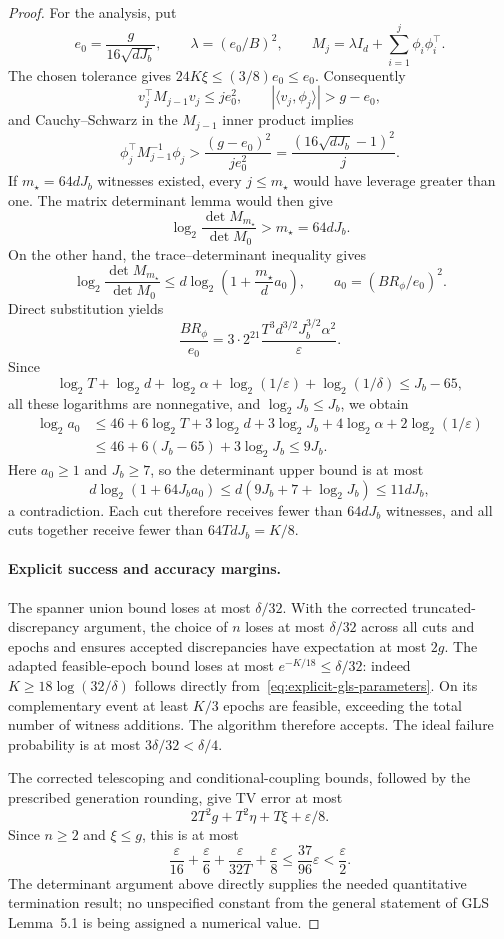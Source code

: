\documentclass[11pt]{article}
\theoremstyle{definition}
\theoremstyle{remark}
\begin{document}
\begin{proof}
For the analysis, put
\[
e_0=\frac{g}{16\sqrt{dJ_b}},\qquad
\lambda=(e_0/B)^2,\qquad
M_j=\lambda I_d+\sum_{i=1}^{j}\phi_i\phi_i^\top.
\]
The chosen tolerance gives $24K\xi\le(3/8)e_0\le e_0$. Consequently
\[
v_j^\top M_{j-1}v_j\le je_0^2,\qquad
|\langle v_j,\phi_j\rangle|>g-e_0,
\]
and Cauchy--Schwarz in the $M_{j-1}$ inner product implies
\[
\phi_j^\top M_{j-1}^{-1}\phi_j
>\frac{(g-e_0)^2}{je_0^2}
=\frac{(16\sqrt{dJ_b}-1)^2}{j}.
\]
If $m_\star=64dJ_b$ witnesses existed, every $j\le m_\star$ would have leverage greater than one. The matrix determinant lemma would then give
\[
\log_2\frac{\det M_{m_\star}}{\det M_0}>m_\star=64dJ_b.
\]
On the other hand, the trace--determinant inequality gives
\[
\log_2\frac{\det M_{m_\star}}{\det M_0}
\le d\log_2\left(1+\frac{m_\star}{d}a_0\right),
\qquad a_0=(BR_\phi/e_0)^2.
\]
Direct substitution yields
\[
\frac{BR_\phi}{e_0}
=3\cdot2^{21}
\frac{T^3d^{3/2}J_b^{3/2}\alpha^2}{\varepsilon}.
\]
Since
\[
\log_2T+\log_2d+\log_2\alpha+
\log_2(1/\varepsilon)+\log_2(1/\delta)\le J_b-65,
\]
all these logarithms are nonnegative, and $\log_2J_b\le J_b$, we obtain
\[
\begin{split}
\log_2a_0
&\le46+6\log_2T+3\log_2d+3\log_2J_b
 +4\log_2\alpha+2\log_2(1/\varepsilon)\\
&\le46+6(J_b-65)+3\log_2J_b
\le9J_b.
\end{split}
\]
Here $a_0\ge1$ and $J_b\ge7$, so the determinant upper bound is at most
\[
d\log_2(1+64J_ba_0)
\le d(9J_b+7+\log_2J_b)\le11dJ_b,
\]
a contradiction. Each cut therefore receives fewer than $64dJ_b$ witnesses, and all cuts together receive fewer than $64TdJ_b=K/8$.

\paragraph{Explicit success and accuracy margins.}
The spanner union bound loses at most $\delta/32$. With the corrected truncated-discrepancy argument, the choice of $n$ loses at most $\delta/32$ across all cuts and epochs and ensures accepted discrepancies have expectation at most $2g$. The adapted feasible-epoch bound loses at most
$e^{-K/18}\le\delta/32$: indeed $K\ge18\log(32/\delta)$ follows directly from~\eqref{eq:explicit-gls-parameters}. On its complementary event at least $K/3$ epochs are feasible, exceeding the total number of witness additions. The algorithm therefore accepts. The ideal failure probability is at most $3\delta/32<\delta/4$.

The corrected telescoping and conditional-coupling bounds, followed by the prescribed generation rounding, give TV error at most
\[
2T^2g+T^2\eta+T\xi+\varepsilon/8.
\]
Since $n\ge2$ and $\xi\le g$, this is at most
\[
\frac{\varepsilon}{16}+\frac{\varepsilon}{6}
+\frac{\varepsilon}{32T}+\frac{\varepsilon}{8}
\le\frac{37}{96}\varepsilon<\frac{\varepsilon}{2}.
\]
The determinant argument above directly supplies the needed quantitative termination result; no unspecified constant from the general statement of GLS Lemma~5.1 is being assigned a numerical value.


\end{proof}
\end{document}
